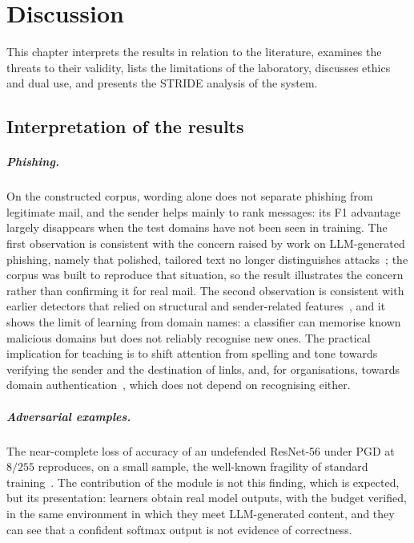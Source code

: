\chapter{Discussion}
\label{cha:disc}

This chapter interprets the results in relation to the literature, examines the threats to their validity, lists the limitations of the laboratory, discusses ethics and dual use, and presents the STRIDE analysis of the system.

\section{Interpretation of the results}
\label{sec:interp}

\paragraph{Phishing.} On the constructed corpus, wording alone does not separate phishing from legitimate mail, and the sender helps mainly to rank messages: its F1 advantage largely disappears when the test domains have not been seen in training. The first observation is consistent with the concern raised by work on LLM-generated phishing, namely that polished, tailored text no longer distinguishes attacks~\cite{hazell2023spear,heiding2024devising}; the corpus was built to reproduce that situation, so the result illustrates the concern rather than confirming it for real mail. The second observation is consistent with earlier detectors that relied on structural and sender-related features~\cite{fette2007learning}, and it shows the limit of learning from domain names: a classifier can memorise known malicious domains but does not reliably recognise new ones. The practical implication for teaching is to shift attention from spelling and tone towards verifying the sender and the destination of links, and, for organisations, towards domain authentication~\cite{rfc9989}, which does not depend on recognising either.

\paragraph{Adversarial examples.} The near-complete loss of accuracy of an undefended ResNet-56 under PGD at $8/255$ reproduces, on a small sample, the well-known fragility of standard training~\cite{szegedy2014intriguing,madry2018towards}. The contribution of the module is not this finding, which is expected, but its presentation: learners obtain real model outputs, with the budget verified, in the same environment in which they meet LLM-generated content, and they can see that a confident softmax output is not evidence of correctness.

